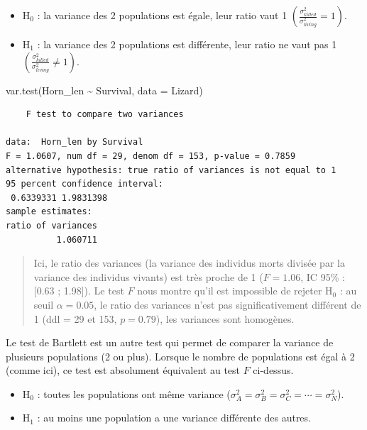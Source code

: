 \documentclass[
  a4paper,
]{article}
\newenvironment{Shaded}{\begin{snugshade}}{\end{snugshade}}
\newcommand{\AttributeTok}[1]{\textcolor[rgb]{0.00,0.34,0.68}{#1}}
\newcommand{\FunctionTok}[1]{\textcolor[rgb]{0.39,0.29,0.61}{#1}}
\newcommand{\NormalTok}[1]{\textcolor[rgb]{0.12,0.11,0.11}{#1}}
\newcommand{\SpecialCharTok}[1]{\textcolor[rgb]{0.24,0.68,0.91}{#1}}
\providecommand{\tightlist}{%
  \setlength{\itemsep}{0pt}\setlength{\parskip}{0pt}}
\begin{document}
\begin{itemize}
\tightlist
\item
  H\(_0\) : la variance des 2 populations est égale, leur ratio vaut 1 \(\left(\frac{\sigma^2_{killed}}{\sigma^2_{living}} = 1\right)\).
\item
  H\(_1\) : la variance des 2 populations est différente, leur ratio ne vaut pas 1 \(\left(\frac{\sigma^2_{killed}}{\sigma^2_{living}} \neq 1\right)\).
\end{itemize}

\begin{Shaded}
\begin{Highlighting}[]
\FunctionTok{var.test}\NormalTok{(Horn\_len }\SpecialCharTok{\textasciitilde{}}\NormalTok{ Survival, }\AttributeTok{data =}\NormalTok{ Lizard)}
\end{Highlighting}
\end{Shaded}

\begin{verbatim}
    F test to compare two variances

data:  Horn_len by Survival
F = 1.0607, num df = 29, denom df = 153, p-value = 0.7859
alternative hypothesis: true ratio of variances is not equal to 1
95 percent confidence interval:
 0.6339331 1.9831398
sample estimates:
ratio of variances 
          1.060711 
\end{verbatim}

\begin{quote}
Ici, le ratio des variances (la variance des individus morts divisée par la variance des individus vivants) est très proche de 1 (\(F = 1.06\), IC 95\% : {[}0.63 ; 1.98{]}). Le test \(F\) nous montre qu'il est impossible de rejeter H\(_0\) : au seuil \(\alpha = 0.05\), le ratio des variances n'est pas significativement différent de 1 (ddl = 29 et 153, \(p = 0.79\)), les variances sont homogènes.
\end{quote}

Le test de Bartlett est un autre test qui permet de comparer la variance de plusieurs populations (2 ou plus). Lorsque le nombre de populations est égal à 2 (comme ici), ce test est absolument équivalent au test \(F\) ci-dessus.

\begin{itemize}
\tightlist
\item
  H\(_0\) : toutes les populations ont même variance (\(\sigma^2_A = \sigma^2_B = \sigma^2_C = \cdots = \sigma^2_N\)).
\item
  H\(_1\) : au moins une population a une variance différente des autres.
\end{itemize}
\end{document}
